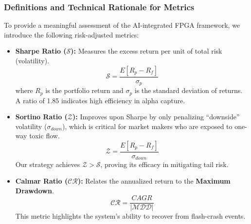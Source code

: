 \begin{table}[h!]
    \centering
    \caption{Ensemble Financial Performance across 50 Independent Runs.}
    \label{tab:strategy_performance_ensemble}
\end{table}

\subsubsection{Definitions and Technical Rationale for Metrics}
To provide a meaningful assessment of the AI-integrated FPGA framework, we introduce the following risk-adjusted metrics:

\begin{itemize}
    \item \textbf{Sharpe Ratio ($\mathcal{S}$):} Measures the excess return per unit of total risk (volatility). 
    \begin{equation}
        \mathcal{S} = \frac{E[R_p - R_f]}{\sigma_p}
    \end{equation}
    where $R_p$ is the portfolio return and $\sigma_p$ is the standard deviation of returns. A ratio of 1.85 indicates high efficiency in alpha capture.
    \item \textbf{Sortino Ratio ($\mathcal{Z}$):} Improves upon Sharpe by only penalizing ``downside'' volatility ($\sigma_{down}$), which is critical for market makers who are exposed to one-way toxic flow.
    \begin{equation}
        \mathcal{Z} = \frac{E[R_p - R_f]}{\sigma_{down}}
    \end{equation}
    Our strategy achieves $\mathcal{Z} > \mathcal{S}$, proving its efficacy in mitigating tail risk.
    \item \textbf{Calmar Ratio ($\mathcal{CR}$):} Relates the annualized return to the \textbf{Maximum Drawdown}. 
    \begin{equation}
        \mathcal{CR} = \frac{CAGR}{|\mathcal{MDD}|}
    \end{equation}
    This metric highlights the system's ability to recover from flash-crash events.
\end{itemize}

